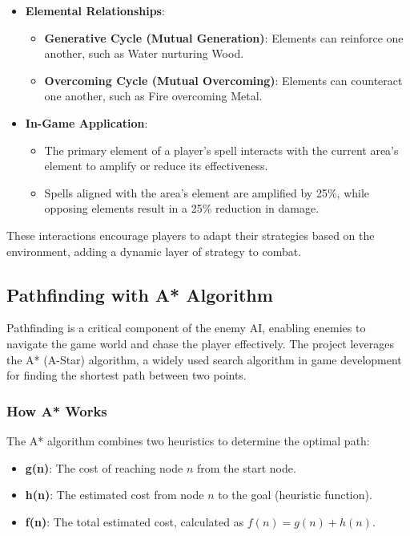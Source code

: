 \documentclass[10pt,twocolumn]{article}
\begin{document}
\begin{itemize}
    \item \textbf{Elemental Relationships}:
        \begin{itemize}
            \item \textbf{Generative Cycle (Mutual Generation)}: Elements can reinforce one another, such as Water nurturing Wood.
            \item \textbf{Overcoming Cycle (Mutual Overcoming)}: Elements can counteract one another, such as Fire overcoming Metal.
        \end{itemize}
    \item \textbf{In-Game Application}:
        \begin{itemize}
            \item The primary element of a player's spell interacts with the current area's element to amplify or reduce its effectiveness.
            \item Spells aligned with the area’s element are amplified by 25\%, while opposing elements result in a 25\% reduction in damage.
        \end{itemize}
\end{itemize}

These interactions encourage players to adapt their strategies based on the environment, adding a dynamic layer of strategy to combat.

\subsection{Pathfinding with A* Algorithm}
Pathfinding is a critical component of the enemy AI, enabling enemies to navigate the game world and chase the player effectively. The project leverages the A* (A-Star) algorithm, a widely used search algorithm in game development for finding the shortest path between two points.

\subsubsection{How A* Works}
The A* algorithm combines two heuristics to determine the optimal path:
\begin{itemize}
    \item \textbf{g(n)}: The cost of reaching node \(n\) from the start node.
    \item \textbf{h(n)}: The estimated cost from node \(n\) to the goal (heuristic function).
    \item \textbf{f(n)}: The total estimated cost, calculated as \(f(n) = g(n) + h(n)\).
\end{itemize}
\end{document}

